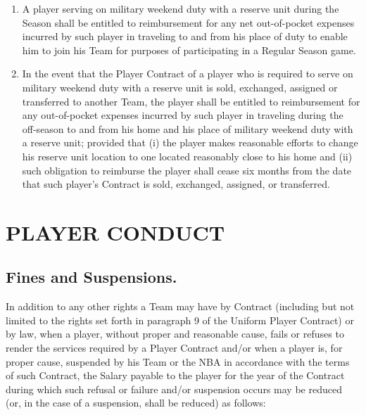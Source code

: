 \documentclass[
]{book}
\providecommand{\tightlist}{%
  \setlength{\itemsep}{0pt}\setlength{\parskip}{0pt}}
\begin{document}
\begin{enumerate}
\def\labelenumi{(\alph{enumi})}
\tightlist
\item
  A player serving on military weekend duty with a reserve unit during the Season shall be entitled to reimbursement for any net out-of-pocket expenses incurred by such player in traveling to and from his place of duty to enable him to join his Team for purposes of participating in a Regular Season game.
\item
  In the event that the Player Contract of a player who is required to serve on military weekend duty with a reserve unit is sold, exchanged, assigned or transferred to another Team, the player shall be entitled to reimbursement for any out-of-pocket expenses incurred by such player in traveling during the off-season to and from his home and his place of military weekend duty with a reserve unit; provided that (i) the player makes reasonable efforts to change his reserve unit location to one located reasonably close to his home and (ii) such obligation to reimburse the player shall cease six months from the date that such player's Contract is sold, exchanged, assigned, or transferred.
\end{enumerate}

\hypertarget{player-conduct}{%
\chapter{PLAYER CONDUCT}\label{player-conduct}}

\hypertarget{fines-and-suspensions.}{%
\section{Fines and Suspensions.}\label{fines-and-suspensions.}}

In addition to any other rights a Team may have by Contract (including but not limited to the rights set forth in paragraph 9 of the Uniform Player Contract) or by law, when a player, without proper and reasonable cause, fails or refuses to render the services required by a Player Contract and/or when a player is, for proper cause, suspended by his Team or the NBA in accordance with the terms of such Contract, the Salary payable to the player for the year of the Contract during which such refusal or failure and/or suspension occurs may be reduced (or, in the case of a suspension, shall be reduced) as follows:
\end{document}
